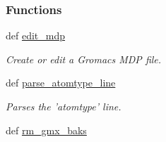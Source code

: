 \subsubsection*{\-Functions}
\begin{DoxyCompactItemize}
\item 
def \hyperlink{namespaceforcebalance_1_1gmxio_acc5bef2c5c991cd70a948a1dd43ef6a6}{edit\-\_\-mdp}
\begin{DoxyCompactList}\small\item\em \-Create or edit a \-Gromacs \-M\-D\-P file. \end{DoxyCompactList}\item 
def \hyperlink{namespaceforcebalance_1_1gmxio_a29af6ace00d7e58258e0a854ca13d954}{parse\-\_\-atomtype\-\_\-line}
\begin{DoxyCompactList}\small\item\em \-Parses the 'atomtype' line. \end{DoxyCompactList}\item 
def \hyperlink{namespaceforcebalance_1_1gmxio_acac8488f29b62fb0d4cb54bb5a041026}{rm\-\_\-gmx\-\_\-baks}
\end{DoxyCompactItemize}
